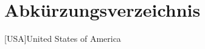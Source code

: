 \chapter*{Abkürzungsverzeichnis} \label{sec:Abkuerzungsverzeichnis}
\begin{acronym}
[USA]{United States of America}

\end{acronym}
